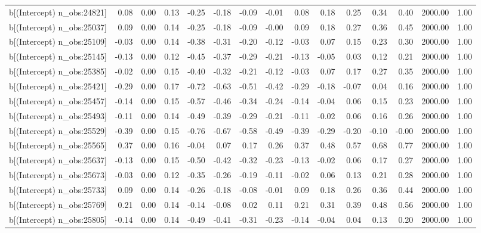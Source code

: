 \begin{table}[ht]
\begin{tabular}{rrrrrrrrrrrrrrr}
  b[(Intercept) n\_obs:24821] & 0.08 & 0.00 & 0.13 & -0.25 & -0.18 & -0.09 & -0.01 & 0.08 & 0.18 & 0.25 & 0.34 & 0.40 & 2000.00 & 1.00 \\ 
  b[(Intercept) n\_obs:25037] & 0.09 & 0.00 & 0.14 & -0.25 & -0.18 & -0.09 & -0.00 & 0.09 & 0.18 & 0.27 & 0.36 & 0.45 & 2000.00 & 1.00 \\ 
  b[(Intercept) n\_obs:25109] & -0.03 & 0.00 & 0.14 & -0.38 & -0.31 & -0.20 & -0.12 & -0.03 & 0.07 & 0.15 & 0.23 & 0.30 & 2000.00 & 1.00 \\ 
  b[(Intercept) n\_obs:25145] & -0.13 & 0.00 & 0.12 & -0.45 & -0.37 & -0.29 & -0.21 & -0.13 & -0.05 & 0.03 & 0.12 & 0.21 & 2000.00 & 1.00 \\ 
  b[(Intercept) n\_obs:25385] & -0.02 & 0.00 & 0.15 & -0.40 & -0.32 & -0.21 & -0.12 & -0.03 & 0.07 & 0.17 & 0.27 & 0.35 & 2000.00 & 1.00 \\ 
  b[(Intercept) n\_obs:25421] & -0.29 & 0.00 & 0.17 & -0.72 & -0.63 & -0.51 & -0.42 & -0.29 & -0.18 & -0.07 & 0.04 & 0.16 & 2000.00 & 1.00 \\ 
  b[(Intercept) n\_obs:25457] & -0.14 & 0.00 & 0.15 & -0.57 & -0.46 & -0.34 & -0.24 & -0.14 & -0.04 & 0.06 & 0.15 & 0.23 & 2000.00 & 1.00 \\ 
  b[(Intercept) n\_obs:25493] & -0.11 & 0.00 & 0.14 & -0.49 & -0.39 & -0.29 & -0.21 & -0.11 & -0.02 & 0.06 & 0.16 & 0.26 & 2000.00 & 1.00 \\ 
  b[(Intercept) n\_obs:25529] & -0.39 & 0.00 & 0.15 & -0.76 & -0.67 & -0.58 & -0.49 & -0.39 & -0.29 & -0.20 & -0.10 & -0.00 & 2000.00 & 1.00 \\ 
  b[(Intercept) n\_obs:25565] & 0.37 & 0.00 & 0.16 & -0.04 & 0.07 & 0.17 & 0.26 & 0.37 & 0.48 & 0.57 & 0.68 & 0.77 & 2000.00 & 1.00 \\ 
  b[(Intercept) n\_obs:25637] & -0.13 & 0.00 & 0.15 & -0.50 & -0.42 & -0.32 & -0.23 & -0.13 & -0.02 & 0.06 & 0.17 & 0.27 & 2000.00 & 1.00 \\ 
  b[(Intercept) n\_obs:25673] & -0.03 & 0.00 & 0.12 & -0.35 & -0.26 & -0.19 & -0.11 & -0.02 & 0.06 & 0.13 & 0.21 & 0.28 & 2000.00 & 1.00 \\ 
  b[(Intercept) n\_obs:25733] & 0.09 & 0.00 & 0.14 & -0.26 & -0.18 & -0.08 & -0.01 & 0.09 & 0.18 & 0.26 & 0.36 & 0.44 & 2000.00 & 1.00 \\ 
  b[(Intercept) n\_obs:25769] & 0.21 & 0.00 & 0.14 & -0.14 & -0.08 & 0.02 & 0.11 & 0.21 & 0.31 & 0.39 & 0.48 & 0.56 & 2000.00 & 1.00 \\ 
  b[(Intercept) n\_obs:25805] & -0.14 & 0.00 & 0.14 & -0.49 & -0.41 & -0.31 & -0.23 & -0.14 & -0.04 & 0.04 & 0.13 & 0.20 & 2000.00 & 1.00 \\ 

\end{tabular}
\end{table}
